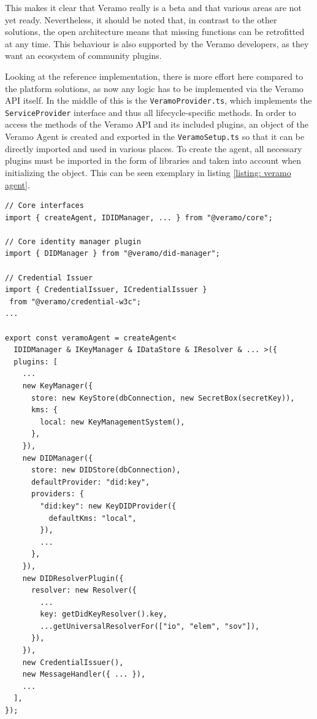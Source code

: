     This makes it clear that Veramo really is a beta and that various areas are not yet ready. Nevertheless, it should be noted that, in contrast to the other solutions, the open architecture means that missing functions can be retrofitted at any time. This behaviour is also supported by the Veramo developers, as they want an ecosystem of community plugins.
    
    Looking at the reference implementation, there is more effort here compared to the platform solutions, as now any logic has to be implemented via the Veramo API itself. In the middle of this is the \texttt{VeramoProvider.ts}, which implements the \texttt{ServiceProvider} interface and thus all lifecycle-specific methods. In order to access the methods of the Veramo API and its included plugins, an object of the Veramo Agent is created and exported in the \texttt{VeramoSetup.ts} so that it can be directly imported and used in various places. To create the agent, all necessary plugins must be imported in the form of libraries and taken into account when initializing the object. This can be seen exemplary in listing \ref{listing: veramo agent}. 
    \newline
    \begin{lstlisting}[style=ES6, caption=Veramo agent creation, label={listing: veramo agent}]
// Core interfaces
import { createAgent, IDIDManager, ... } from "@veramo/core";

// Core identity manager plugin
import { DIDManager } from "@veramo/did-manager";

// Credential Issuer
import { CredentialIssuer, ICredentialIssuer } 
 from "@veramo/credential-w3c";
...

export const veramoAgent = createAgent<
  IDIDManager & IKeyManager & IDataStore & IResolver & ... >({
  plugins: [
    ...
    new KeyManager({
      store: new KeyStore(dbConnection, new SecretBox(secretKey)),
      kms: {
        local: new KeyManagementSystem(),
      },
    }),
    new DIDManager({
      store: new DIDStore(dbConnection),
      defaultProvider: "did:key",
      providers: {
        "did:key": new KeyDIDProvider({
          defaultKms: "local",
        }),
        ...
      },
    }),
    new DIDResolverPlugin({
      resolver: new Resolver({
        ...
        key: getDidKeyResolver().key,
        ...getUniversalResolverFor(["io", "elem", "sov"]),
      }),
    }),
    new CredentialIssuer(),
    new MessageHandler({ ... }),
    ...
  ],
});\end{lstlisting}
    
